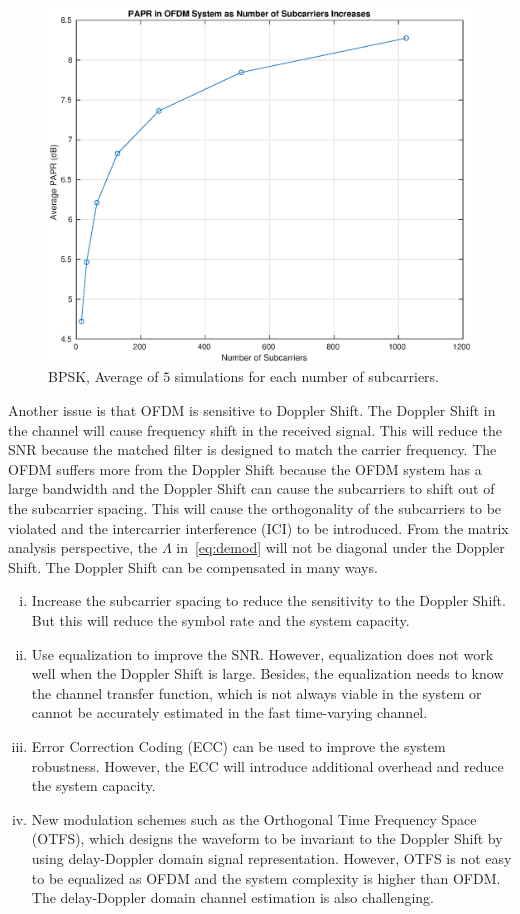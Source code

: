 \begin{figure}[!htbp]
    \centering
    \includegraphics[width=\linewidth]{PAPR.eps}
    \caption{BPSK, Average of $5$ simulations for each number of subcarriers.}
    \label{fig:PAPR}
\end{figure}

Another issue is that OFDM is sensitive to Doppler Shift. The Doppler Shift in the channel will cause frequency shift in the received signal. This will reduce the SNR because the matched filter is designed to match the carrier frequency. The OFDM suffers more from the Doppler Shift because the OFDM system has a large bandwidth and the Doppler Shift can cause the subcarriers to shift out of the subcarrier spacing. This will cause the orthogonality of the subcarriers to be violated and the intercarrier interference (ICI) to be introduced. From the matrix analysis perspective, the $\Lambda$ in~\cref{eq:demod} will not be diagonal under the Doppler Shift. The Doppler Shift can be compensated in many ways.
\begin{enumerate}[(i)]
    \item Increase the subcarrier spacing to reduce the sensitivity to the Doppler Shift. But this will reduce the symbol rate and the system capacity.
    \item Use equalization to improve the SNR. However, equalization does not work well when the Doppler Shift is large. Besides, the equalization needs to know the channel transfer function, which is not always viable in the system or cannot be accurately estimated in the fast time-varying channel.
    \item Error Correction Coding (ECC) can be used to improve the system robustness. However, the ECC will introduce additional overhead and reduce the system capacity.
    \item New modulation schemes such as the Orthogonal Time Frequency Space (OTFS), which designs the waveform to be invariant to the Doppler Shift by using delay-Doppler domain signal representation. However, OTFS is not easy to be equalized as OFDM and the system complexity is higher than OFDM. The delay-Doppler domain channel estimation is also challenging.
\end{enumerate}

